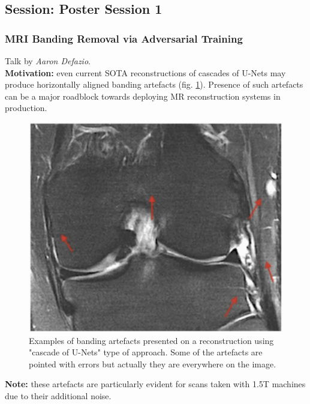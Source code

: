 \subsection{Session: Poster Session 1}

\subsubsection{MRI Banding Removal via Adversarial Training \cite{DefazioMR20}}

Talk by \textit{Aaron Defazio}. \\

{\bf Motivation:} even current SOTA reconstructions of cascades of U-Nets may produce horizontally aligned banding artefacts (fig. \ref{fig:banding_arts}). 
Presence of such artefacts can be a major roadblock towards deploying MR reconstruction systems in production. \\

\begin{figure}[h!]
    \centering
    \includegraphics[scale=0.4]{neurips-2020/images/Screenshot 2020-12-15 at 09.25.34.png}
    \caption{Examples of banding artefacts presented on a reconstruction using "cascade of U-Nets" type of approach. Some of the artefacts are pointed with errors but actually they are everywhere on the image.}
    \label{fig:banding_arts}
\end{figure}

{\bf Note:} these artefacts are particularly evident for scans taken with 1.5T machines due to their additional noise. \\

